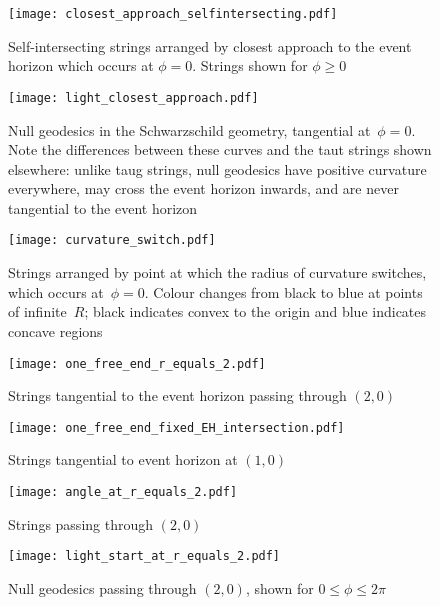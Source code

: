 \documentclass[prb,preprint]{revtex4-1}
\begin{document}
\begin{figure}[p] %
\centering
\texttt{[image: closest\_approach\_selfintersecting.pdf]}
\caption{Self-intersecting strings arranged by closest approach to the
  event horizon which occurs at $\phi=0$.  Strings shown for $\phi\geq
  0$}
\label{closest_approach_self_intersecting}
\end{figure}

\begin{figure}[p] %
\centering
\texttt{[image: light\_closest\_approach.pdf]}
\caption{Null geodesics in the Schwarzschild geometry, tangential
  at~$\phi=0$.  Note the differences between these curves and the taut
  strings shown elsewhere: unlike taug strings, null geodesics have
  positive curvature everywhere, may cross the event horizon inwards,
  and are never tangential to the event horizon}
\label{light_closest_approach}
\end{figure}

\begin{figure}[p]
\centering
\texttt{[image: curvature\_switch.pdf]} %
\caption{Strings arranged by point at which the radius of curvature
  switches, which occurs at~$\phi=0$.  Colour changes from black to
  blue at points of infinite~$R$; black indicates convex to the origin
  and blue indicates concave regions}
\label{curvature_switch}
\end{figure}

\begin{figure}[p] %
\centering
\texttt{[image: one\_free\_end\_r\_equals\_2.pdf]}
\caption{Strings tangential to the event horizon passing through $(2,0)$}
\label{one_free_end_r_equals_2}
\end{figure}

\begin{figure}[p] %
\centering
\texttt{[image: one\_free\_end\_fixed\_EH\_intersection.pdf]}
\caption{Strings tangential to event horizon at $(1,0)$}
\label{fixed_EH_intersection}
\end{figure}

\begin{figure}[p]
\centering
\texttt{[image: angle\_at\_r\_equals\_2.pdf]} %
\caption{Strings passing through $(2,0)$}
\label{strings_r_equals_2}
\end{figure}

\begin{figure}[p]
\centering
\texttt{[image: light\_start\_at\_r\_equals\_2.pdf]} %
\caption{Null geodesics passing through $(2,0)$, shown for $0\leq\phi\leq 2\pi$}
\label{light_r_equals_2}
\end{figure}
\end{document}
